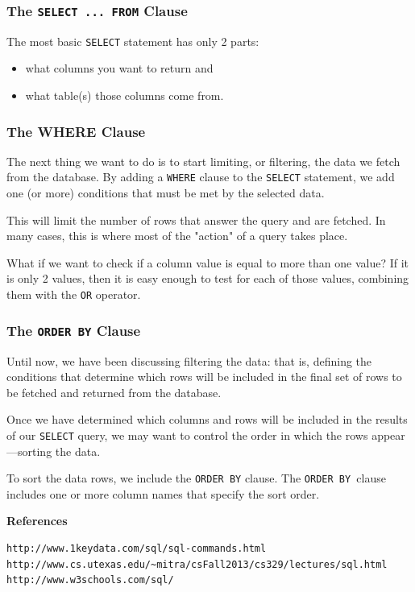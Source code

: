 \subsubsection*{The \texttt{SELECT ... FROM} Clause}
The most basic \texttt{SELECT} statement has only 2 parts: 
\begin{itemize}
\item[(1)] what columns you want to return and 
\item[(2)] what table(s) those columns come from.
\end{itemize}

\subsubsection*{The WHERE Clause}
The next thing we want to do is to start limiting, or filtering, the data we fetch from the database. By adding a \texttt{WHERE} clause to the \texttt{SELECT} statement, we add one (or more) conditions that must be met by the selected data.

 This will limit the number of rows that answer the query and are fetched. In many cases, this is where most of the "action" of a query takes place.

What if we want to check if a column value is equal to more than one value? If it is only 2 values, then it is easy enough to test for each of those values, combining them with the \texttt{OR} operator.

\subsubsection*{The \texttt{ORDER BY} Clause}
Until now, we have been discussing filtering the data: that is, defining the conditions that determine which rows will be included in the final set of rows to be fetched and returned from the database. 

Once we have determined which columns and rows will be included in the results of our \texttt{SELECT} query, we may want to control the order in which the rows appear—sorting the data.

To sort the data rows, we include the \texttt{ORDER BY} clause. The \texttt{ORDER BY }clause includes one or more column names that specify the sort order.

\noindent \textbf{References}
\begin{verbatim}
http://www.1keydata.com/sql/sql-commands.html
http://www.cs.utexas.edu/~mitra/csFall2013/cs329/lectures/sql.html
http://www.w3schools.com/sql/
\end{verbatim}
\newpage
